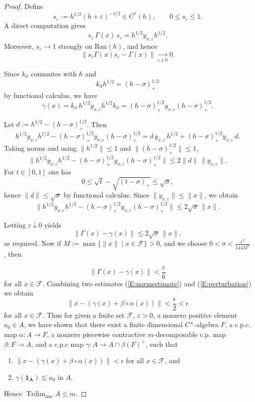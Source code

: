 \documentclass[10pt,a4paper]{amsart}
\def\Trdim{\operatorname{Trdim}}
\newcommand{\mc}{\mathcal}
\def\nuc{\operatorname{nuc}}
\begin{document}
\begin{proof}
Define
\[
s_\varepsilon:=h^{1/2}(h+\varepsilon)^{-1/2}\in C^*(h),\qquad 0\le s_\varepsilon\le 1.
\]
A direct computation gives
\[
s_\varepsilon\,\Gamma(x)\,s_\varepsilon
= h^{1/2}y_{x,\varepsilon}h^{1/2}.
\]
Moreover, $s_\varepsilon\to 1$ strongly on $\overline{\mathrm{Ran}(h)}$, and hence
\[
\|s_\varepsilon\Gamma(x)s_\varepsilon-\Gamma(x)\|\xrightarrow[\varepsilon\downarrow 0]{}0.
\]

Since $k_\sigma$ commutes with $h$ and
\[
k_\sigma h^{1/2}=(h-\sigma)_+^{1/2}
\]
by functional calculus, we have
\[
\gamma(x)
=k_\sigma\,h^{1/2}y_{x,\varepsilon}h^{1/2}k_\sigma
=(h-\sigma)_+^{1/2}y_{x,\varepsilon}(h-\sigma)_+^{1/2}.
\]

Let $d:=h^{1/2}-(h-\sigma)_+^{1/2}$. Then
\[
h^{1/2}y_{x,\varepsilon}h^{1/2}
-(h-\sigma)_+^{1/2}y_{x,\varepsilon}(h-\sigma)_+^{1/2}
= d\,y_{x,\varepsilon}\,h^{1/2}
+(h-\sigma)_+^{1/2}y_{x,\varepsilon}\,d.
\]
Taking norms and using $\|h^{1/2}\|\le 1$ and $\|(h-\sigma)_+^{1/2}\|\le 1$,
\[
\|h^{1/2}y_{x,\varepsilon}h^{1/2}
-(h-\sigma)_+^{1/2}y_{x,\varepsilon}(h-\sigma)_+^{1/2}\|
\le 2\|d\|\,\|y_{x,\varepsilon}\|.
\]
For  $t\in[0,1]$ one has
\[
0\le \sqrt{t}-\sqrt{(t-\sigma)_+}\le \sqrt{\sigma},
\]
hence $\|d\|\le \sqrt{\sigma}$ by functional calculus.
Since $\|y_{x,\varepsilon}\|\le \|x\|$, we obtain
\[
\|h^{1/2}y_{x,\varepsilon}h^{1/2}
-(h-\sigma)_+^{1/2}y_{x,\varepsilon}(h-\sigma)_+^{1/2}\|
\le 2\sqrt{\sigma}\,\|x\|.
\]

Letting $\varepsilon\downarrow 0$ yields
\[
\|\Gamma(x)-\gamma(x)\|\le 2\sqrt{\sigma}\,\|x\|,
\]
as required.
Now if $M:=\max\{ \|x\| \mid x \in \mc{F}\}> 0$, and we choose $0< \sigma < \frac{\varepsilon^2}{144M^2}$, then

\begin{equation}\label{E:perturbation}
\|\Gamma(x)-\gamma(x)\|<\frac{\varepsilon}{6}
\end{equation}
for all $x \in \mc{F}$. 
Combining two estimates (\ref{E:normestimate}) and (\ref{E:perturbation}) we obtain 
\[ 
\| x - (\gamma(x) + \beta \circ \alpha (x))\| < \frac{\epsilon}{2}< \epsilon
\]
for all $x \in \mc{F}$. 
Thus for given a finite set $\mc{F}$, $\varepsilon>0$, a nonzero positive element $a_0 \in A$, we have shown that there exist a finite dimensional $C\sp*$-algebra $F$, a c.p.c. map $\alpha: A \to F$, a nonzero piecewise contractive $m$-decomposable c.p. map $\beta: F \to A$, and a c.p.c map $\gamma: A \to A\cap \beta(F)^{\perp}$, such that 
\begin{enumerate}
\item $ \|x - (\gamma(x)+ \beta \circ \alpha (x)) \| < \epsilon$ for all $x\in \mc{F}$, and 
\item $\gamma(\mathbf{1_A}) \lesssim a_0$ in $A$. 
\end{enumerate}
Hence $\Trdim_{\nuc}A \le m$. 
\end{proof}
\end{document}
